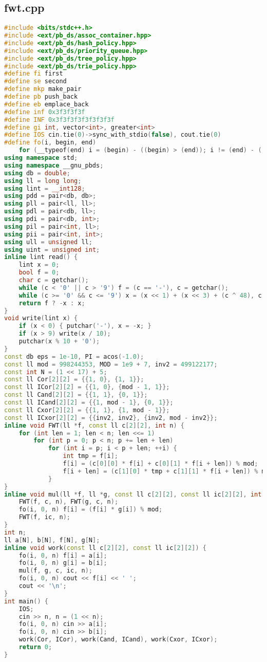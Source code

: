\documentclass[9pt, a4paper, oneside]{book}
\begin{document}
\subsection{fwt.cpp}
\begin{lstlisting}[language={C++}]
#include <bits/stdc++.h>
#include <ext/pb_ds/assoc_container.hpp>
#include <ext/pb_ds/hash_policy.hpp>
#include <ext/pb_ds/priority_queue.hpp>
#include <ext/pb_ds/tree_policy.hpp>
#include <ext/pb_ds/trie_policy.hpp>
#define fi first
#define se second
#define mkp make_pair
#define pb push_back
#define eb emplace_back
#define inf 0x3f3f3f3f
#define INF 0x3f3f3f3f3f3f3f3f
#define gi int, vector<int>, greater<int>
#define IOS cin.tie(0)->sync_with_stdio(false), cout.tie(0)
#define fo(i, begin, end)                                                                                              \
    for (__typeof(end) i = (begin) - ((begin) > (end)); i != (end) - ((begin) > (end)); i += 1 - 2 * ((begin) > (end)))
using namespace std;
using namespace __gnu_pbds;
using db = double;
using ll = long long;
using lint = __int128;
using pdd = pair<db, db>;
using pll = pair<ll, ll>;
using pdl = pair<db, ll>;
using pdi = pair<db, int>;
using pil = pair<int, ll>;
using pii = pair<int, int>;
using ull = unsigned ll;
using uint = unsigned int;
inline lint read() {
    lint x = 0;
    bool f = 0;
    char c = getchar();
    while (c < '0' || c > '9') f = (c == '-'), c = getchar();
    while (c >= '0' && c <= '9') x = (x << 1) + (x << 3) + (c ^ 48), c = getchar();
    return f ? -x : x;
}
void write(lint x) {
    if (x < 0) { putchar('-'), x = -x; }
    if (x > 9) write(x / 10);
    putchar(x % 10 + '0');
}
const db eps = 1e-10, PI = acos(-1.0);
const ll mod = 998244353, MOD = 1e9 + 7, inv2 = 499122177;
const int N = (1 << 17) + 5;
const ll Cor[2][2] = {{1, 0}, {1, 1}};
const ll ICor[2][2] = {{1, 0}, {mod - 1, 1}};
const ll Cand[2][2] = {{1, 1}, {0, 1}};
const ll ICand[2][2] = {{1, mod - 1}, {0, 1}};
const ll Cxor[2][2] = {{1, 1}, {1, mod - 1}};
const ll ICxor[2][2] = {{inv2, inv2}, {inv2, mod - inv2}};
inline void FWT(ll *f, const ll c[2][2], int n) {
    for (int len = 1; len < n; len <<= 1)
        for (int p = 0; p < n; p += len + len)
            for (int i = p; i < p + len; ++i) {
                int tmp = f[i];
                f[i] = (c[0][0] * f[i] + c[0][1] * f[i + len]) % mod;
                f[i + len] = (c[1][0] * tmp + c[1][1] * f[i + len]) % mod;
            }
}
inline void mul(ll *f, ll *g, const ll c[2][2], const ll ic[2][2], int n) {
    FWT(f, c, n), FWT(g, c, n);
    fo(i, 0, n) f[i] = (f[i] * g[i]) % mod;
    FWT(f, ic, n);
}
int n;
ll a[N], b[N], f[N], g[N];
inline void work(const ll c[2][2], const ll ic[2][2]) {
    fo(i, 0, n) f[i] = a[i];
    fo(i, 0, n) g[i] = b[i];
    mul(f, g, c, ic, n);
    fo(i, 0, n) cout << f[i] << ' ';
    cout << '\n';
}
int main() {
    IOS;
    cin >> n, n = (1 << n);
    fo(i, 0, n) cin >> a[i];
    fo(i, 0, n) cin >> b[i];
    work(Cor, ICor), work(Cand, ICand), work(Cxor, ICxor);
    return 0;
}\end{lstlisting}
\end{document}

